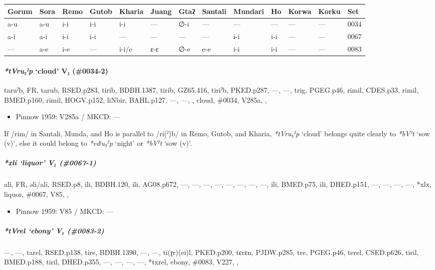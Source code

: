 \documentclass[a4paper,]{article}
\providecommand{\tightlist}{%
  \setlength{\itemsep}{0pt}\setlength{\parskip}{0pt}}
\let\oldparagraph\paragraph
\renewcommand{\paragraph}[1]{\oldparagraph{#1}\mbox{}}
\let\oldsubparagraph\subparagraph
\renewcommand{\subparagraph}[1]{\oldsubparagraph{#1}\mbox{}}
\begin{document}
\begin{longtable}[]{@{}lllllllllllll@{}}
\toprule
Gorum & Sora & Remo & Gutob & Kharia & Juang & Gtaʔ & Santali & Mundari
& Ho & Korwa & Korku & Set\tabularnewline
\midrule
\endhead
a-u & a-u & i-i & i-i & i-i & --- & ∅-i & --- & --- & --- & --- & --- &
0034\tabularnewline
a-i & a-i & i-i & i-i & --- & --- & --- & --- & i-i & i-i & --- & --- &
0067\tabularnewline
--- & a-e & i-e & --- & i-i/e & ɛ-ɛ & ∅-e & e-e & i-i & i-i & --- & ---
& 0083\tabularnewline
\bottomrule
\end{longtable}

\paragraph{\texorpdfstring{\emph{*tVru₅ˀp} `cloud' V₁
(\#0034-2)}{*tVru₅ˀp cloud V₁ (\#0034-2)}}\label{tvruux2c0p-cloud-v-0034-2}

taruˀb, FR, tarub, RSED.p283, tirib, BDBH.1387, tirib, GZ65.416, tiriˀb,
PKED.p287, ---, ---, trig, PGEG.p46, rimil, CDES.p33, rimil, BMED.p160,
rimil, HOGV.p152, liNbir, BAHL.p127, ---, ---, , cloud, \#0034, V285a, ,

\begin{itemize}
\tightlist
\item
  Pinnow 1959: V285a / MKCD: ---
\end{itemize}

If /rim/ in Santali, Munda, and Ho is parallel to /ri(ˀ)b/ in Remo,
Gutob, and Kharia, \emph{*tVru₅ˀp} `cloud' belongs quite clearly to
\emph{*bVˀt} `sow (v)', else it could belong to \emph{*vdʲu₅ˀp} `night'
or \emph{*bVˀt} `sow (v)'.

\subparagraph{\texorpdfstring{\emph{*xli} `liquor' V₁
(\#0067-1)}{*xli liquor V₁ (\#0067-1)}}\label{xli-liquor-v-0067-1}

ali, FR, əli/ali, RSED.p8, ili, BDBH.120, ili, AG08.p672, ---, ---, ---,
---, ---, ---, ---, ---, ili, BMED.p75, ili, DHED.p151, ---, ---, ---,
---, *xlx, liquor, \#0067, V85, ,

\begin{itemize}
\tightlist
\item
  Pinnow 1959: V85 / MKCD: ---
\end{itemize}

\subparagraph{\texorpdfstring{\emph{*tVrel} `ebony' V₁
(\#0083-2)}{*tVrel ebony V₁ (\#0083-2)}}\label{tvrel-ebony-v-0083-2}

---, ---, tarel, RSED.p138, tire, BDBH.1390, ---, ---, ti(ɽr)(ei)l,
PKED.p200, tɛrɛn, PJDW.p285, tre, PGEG.p46, terel, CSED.p626, tiril,
BMED.p188, tiril, DHED.p355, ---, ---, ---, ---, *txrel, ebony, \#0083,
V227, ,
\end{document}
